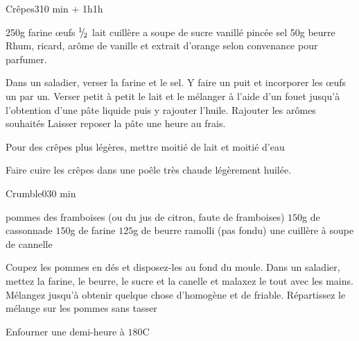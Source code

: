 \begin{recette}{Crêpes}{3}{10 min + 1h}{1h}
\begin{ingredients}
\ingredient 250g farine
 œufs
\ingredient ${{}^{1\!\!}/ _{\!2}}$ lait
 cuillère a soupe de sucre vanillé
 pincée sel
\ingredient 50g beurre
\ingredient Rhum, ricard, arôme de vanille et extrait d'orange selon convenance pour parfumer.
\end{ingredients}


\begin{preparation}
\etape Dans un saladier, verser la farine et le sel.
\etape Y faire un puit et incorporer les œufs un par un.
\etape Verser petit à petit le lait et le mélanger à l'aide d'un fouet jusqu'à l'obtention d'une pâte liquide puis y rajouter l'huile.
\etape Rajouter les arômes souhaités
\etape Laisser reposer la pâte une heure au frais.
\end{preparation}

\begin{remarque}
Pour des crêpes plus légères, mettre moitié de lait et moitié d'eau
\end{remarque}

\begin{cuisson}
Faire cuire les crêpes dans une poêle très chaude légèrement huilée.
\end{cuisson}
\end{recette}

\begin{recette}{Crumble}{0}{}{30 min}
\begin{ingredients}
 pommes
\ingredient des framboises (ou du jus de citron, faute de framboises)
\ingredient $150$g de cassonnade
\ingredient $150$g de farine
\ingredient $125$g de beurre ramolli (pas fondu)
\ingredient une cuillère à soupe de cannelle
\end{ingredients}

\begin{preparation}
\etape Coupez les pommes en dés et disposez-les au fond du moule.
\etape Dans un saladier, mettez la farine, le beurre, le sucre et la canelle et malaxez le tout avec les mains. Mélangez jusqu'à obtenir quelque chose d'homogène et de friable.
\etape Répartissez le mélange sur les pommes sans tasser
\end{preparation}

\begin{cuisson}
Enfourner une demi-heure à $180$\degres C
\end{cuisson}
\end{recette}

